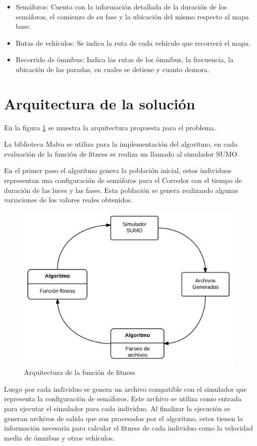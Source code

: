 \begin{itemize}
	\item Semáforos: Cuenta con la información detallada de la duración de los semáforos, el comienzo de su fase y la ubicación del mismo respecto al mapa base.
	\item Rutas de vehículos: Se indica la ruta de cada vehículo que recorrerá el mapa.
	\item Recorrido de ómnibus: Indica las rutas de los ómnibus, la frecuencia, la ubicación de las paradas, en cuales se detiene y cuanto demora.
\end{itemize}




\section{Arquitectura de la solución}

En la figura \ref{fig:arquitectura1} se muestra la arquitectura propuesta para el problema.

La biblioteca Malva se utiliza para la implementación del algoritmo, en cada evaluación de la función de fitness se realiza un llamado al simulador SUMO. 

En el primer paso el algoritmo genera la población inicial, estos individuos representan una configuración de semáforos para el Corredor con el tiempo de duración de las luces y las fases. Esta población se genera realizando algunas variaciones de los valores reales obtenidos.

\begin{figure}[H]
	\centering
	\includegraphics[width=0.7\linewidth]{Figures/arquitectura1}
	\caption{Arquitectura de la función de fitness}
	\label{fig:arquitectura1}
\end{figure}

Luego por cada individuo se genera un archivo compatible con el simulador que representa la configuración de semáforos. Este archivo se utiliza como entrada para ejecutar el simulador para cada individuo. Al finalizar la ejecución se generan archivos de salida que son procesados por el algoritmo, estos tienen la información necesaria para calcular el fitness de cada individuo como la velocidad media de ómnibus y otros vehículos.

